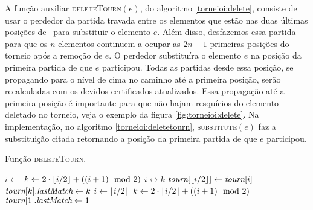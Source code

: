 A função auxiliar \textsc{deleteTourn}$(e)$, do algoritmo
\ref{torneioi:delete}, consiste de usar o perdedor
da partida travada entre os elementos que estão nas duas últimas
posições de \torneio~para substituir o elemento $e$.
Além disso, desfazemos essa partida para que os
$n$ elementos continuem a ocupar as $2n - 1$ primeiras posições
do torneio após a remoção de $e$. O perdedor
substituíra o elemento $e$ na posição da
primeira partida de que $e$ participou. Todas as partidas desde
essa posição, se propagando para o nível de cima no caminho até a
primeira posição, serão recalculadas com os devidos certificados
atualizados. Essa propagação até a primeira posição é importante
para que não hajam resquícios do elemento deletado no torneio,
veja o exemplo da figura \ref{fig:torneioi:delete}. Na implementação,
no algoritmo \ref{torneioi:deletetourn}, \textsc{substitute}$(e)$ faz a
substituição citada retornando a posição da primeira partida
de que $e$ participou.
\begin{algorithm}[H]
\caption{Função \textsc{deleteTourn}.} \label{torneioi:deletetourn}
\begin{algorithmic}[1]
        \State $i \leftarrow $ 
        \State $k \leftarrow 2\cdot \left\lfloor i/2 \right\rfloor + ((i + 1)\mod2)$
                \State $i \leftrightarrow k$
            \EndIf
            \State $\textit{tourn}[\left\lfloor i/2 \right\rfloor] \leftarrow \textit{tourn}[i]$
            \State $\textit{tourn}[k].\textit{lastMatch} \leftarrow k$
            \State {}
            \State $i \leftarrow \left\lfloor i/2 \right\rfloor$
            \State $k \leftarrow 2\cdot \left\lfloor i/2 \right\rfloor + ((i + 1)\mod2)$
        \EndWhile
        \State $\textit{tourn}[1].\textit{lastMatch} \leftarrow 1$
            \State {}
    \EndFunction
\end{algorithmic}
\end{algorithm}

